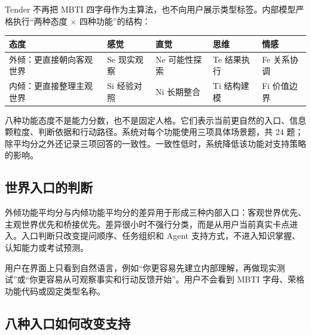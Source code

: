 \documentclass[UTF8,a4paper,11pt]{ctexart}
\begin{document}
Tender 不再把 MBTI 四字母作为主算法，也不向用户展示类型标签。内部模型严格执行“两种态度 $\times$ 四种功能”的结构：

\begin{center}
\begin{longtable}{@{}p{3.0cm}p{2.4cm}p{2.4cm}p{2.4cm}p{2.4cm}@{}}
\toprule
\textbf{态度} & \textbf{感觉} & \textbf{直觉} & \textbf{思维} & \textbf{情感} \\
\midrule
外倾：更直接朝向客观世界 & Se 现实观察 & Ne 可能性探索 & Te 结果执行 & Fe 关系协调 \\
内倾：更直接整理主观世界 & Si 经验对照 & Ni 长期整合 & Ti 结构建模 & Fi 价值边界 \\
\bottomrule
\end{longtable}
\end{center}

八种功能态度不是能力分数，也不是固定人格。它们表示当前更自然的入口、信息颗粒度、判断依据和行动路径。系统对每个功能使用三项具体场景题，共 24 题；除平均分之外还记录三项回答的一致性。一致性低时，系统降低该功能对支持策略的影响。

\subsection{世界入口的判断}

外倾功能平均分与内倾功能平均分的差异用于形成三种内部入口：客观世界优先、主观世界优先和桥接优先。差异很小时不强行分类，而是从用户当前真实卡点进入。入口判断只改变提问顺序、任务组织和 Agent 支持方式，不进入知识掌握、认知能力或考试预测。

用户在界面上只看到自然语言，例如“你更容易先建立内部理解，再做现实测试”或“你更容易从可观察事实和行动反馈开始”。用户不会看到 MBTI 字母、荣格功能代码或固定类型名称。

\subsection{八种入口如何改变支持}
\end{document}
